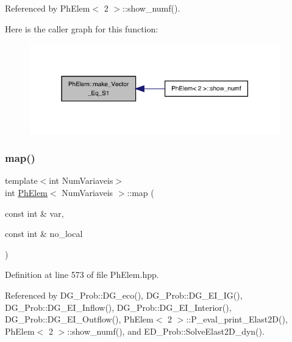 Referenced by Ph\+Elem$<$ 2 $>$\+::show\+\_\+numf().

Here is the caller graph for this function\+:
\nopagebreak
\begin{figure}[H]
\begin{center}
\leavevmode
\includegraphics[width=309pt]{classPhElem_a5f08c96b39a608ac8500897535998d52_icgraph}
\end{center}
\end{figure}
\mbox{\label{classPhElem_a6b7f26c842b4f6b54782c6ddaa4fd6d6}} 
\subsubsection{\texorpdfstring{map()}{map()}}
{\footnotesize\ttfamily template$<$int Num\+Variaveis$>$ \\
int \hyperlink{classPhElem}{Ph\+Elem}$<$ Num\+Variaveis $>$\+::map (\begin{DoxyParamCaption}\item[{const int \&}]{var,  }\item[{const int \&}]{no\+\_\+local }\end{DoxyParamCaption})}



Definition at line 573 of file Ph\+Elem.\+hpp.



Referenced by D\+G\+\_\+\+Prob\+::\+D\+G\+\_\+eco(), D\+G\+\_\+\+Prob\+::\+D\+G\+\_\+\+E\+I\+\_\+\+I\+G(), D\+G\+\_\+\+Prob\+::\+D\+G\+\_\+\+E\+I\+\_\+\+Inflow(), D\+G\+\_\+\+Prob\+::\+D\+G\+\_\+\+E\+I\+\_\+\+Interior(), D\+G\+\_\+\+Prob\+::\+D\+G\+\_\+\+E\+I\+\_\+\+Outflow(), Ph\+Elem$<$ 2 $>$\+::\+P\+\_\+eval\+\_\+print\+\_\+\+Elast2\+D(), Ph\+Elem$<$ 2 $>$\+::show\+\_\+numf(), and E\+D\+\_\+\+Prob\+::\+Solve\+Elast2\+D\+\_\+dyn().

